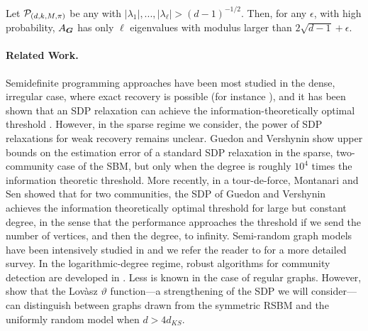 \begin{conjecture}
	Let $\mathcal{P}_{(d,k,M,\pi)}$ be any \model with $|\lambda_1|,...,|\lambda_\ell| > (d-1)^{-1/2}$. Then, for any $\epsilon$, with high probability, $A_{\boldsymbol{G}}$ has only $\ell$ eigenvalues with modulus larger than $2\sqrt{d-1} + \epsilon$.
\end{conjecture}

\paragraph{Related Work.}

Semidefinite programming approaches have been most studied in the dense, irregular case, where exact recovery is possible (for instance \cite{abbe2016exact,abbe2015community}), and it has been shown that an SDP relaxation can achieve the information-theoretically optimal threshold \cite{hajek2016achieving}. However, in the sparse regime we consider, the power of SDP relaxations for weak recovery remains unclear. Guedon and Vershynin \cite{guedon2016community} show upper bounds on the estimation error of a standard SDP relaxation in the sparse, two-community case of the SBM, but only when the degree is roughly $10^4$ times the information theoretic threshold. More recently, in a tour-de-force,  Montanari and Sen \cite{montanari2015semidefinite} showed that for two communities, the SDP of Guedon and Vershynin achieves the information theoretically optimal threshold for large but constant degree, in the sense that the performance approaches the threshold if we send the number of vertices, and then the degree, to infinity.  Semi-random graph models have been intensively studied in \cite{blum1995coloring, feige2000finding, feige2001heuristics,coja2004coloring,krivelevich2006semirandom,coja2007solving, makarychev2012approximation, chen2014clustering,guedon2016community} and we refer the reader to \cite{makarychev2016learning} for a more detailed survey. In the logarithmic-degree regime, robust algorithms for community detection are developed in \cite{cai2015robust, kumar2010clustering, awasthi2012improved}. Less is known in the case of regular graphs. However, \cite{banks2017lov} show that the Lov\`{a}sz $\vartheta$ function---a strengthening of the SDP we will consider---can distinguish between graphs drawn from the symmetric RSBM and the uniformly random model when $d > 4d_{KS}$.


